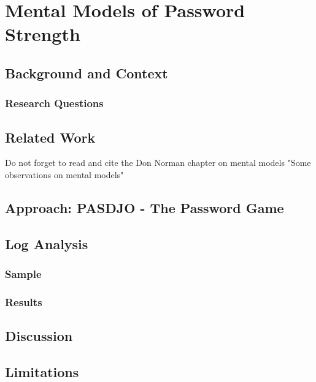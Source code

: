 \chapter[Mental Models of Password Strength]{Mental Models of Password Strength}\label{chap:mental_models}


\section{Background and Context}

\subsection{Research Questions}

\section{Related Work}
Do not forget to read and cite the Don Norman chapter on mental models "Some observations on mental models"
\section{Approach: PASDJO - The Password Game}


\section{Log Analysis}

\subsection{Sample}
\subsection{Results}


\section{Discussion}


\section{Limitations}

